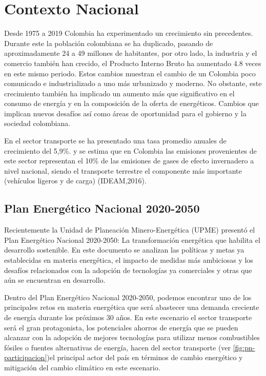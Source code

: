 \chapter{Contexto Nacional}

Desde 1975 a 2019 Colombia ha experimentado un crecimiento sin precedentes. Durante este la población colombiana se ha duplicado, pasando de aproximadamente 24 a 49 millones de habitantes, por otro lado, la industria y el comercio también han crecido, el Producto Interno Bruto ha aumentado 4.8 veces en este mismo periodo. Estos cambios muestran el cambio de un Colombia poco comunicado e industrializado a uno más urbanizado y moderno. \cite{Plan_Energetico-2050} No obstante, este crecimiento también ha implicado un aumento más que significativo en el consumo de energía y en la composición de la oferta de energéticos. Cambios que implican nuevos desafíos así como áreas de oportunidad para el gobierno y la sociedad colombiana. 

En el sector transporte se ha presentado una tasa promedio anuales de crecimiento del  5,9\%. \cite{Plan_Energetico-2050} y se estima que en Colombia las emisiones provenientes de este sector representan el 10\% de las emisiones de gases de efecto invernadero a nivel nacional, siendo el transporte terrestre el componente más importante (vehículos ligeros y de carga) (IDEAM,2016). \cite{InformeFinal_WRI}

\section{Plan Energético Nacional 2020-2050}

Recientemente la Unidad de Planeación Minero-Energética (UPME) presentó el Plan Energético Nacional 2020-2050: La transformación energética que habilita el desarrollo sostenible. En este documento se analizan las políticas y metas ya establecidas en materia energética, el impacto de medidas más ambiciosas y los desafíos relacionados con la adopción de tecnologías ya comerciales y otras que aún se encuentran en desarrollo.

Dentro del Plan Energético Nacional 2020-2050, podemos encontrar uno de los principales retos en materia energética que será abastecer una demanda creciente de energía durante los próximos 30 años. En este escenario el sector transporte será el gran protagonista, los potenciales ahorros de energía que se pueden alcanzar con la adopción de mejores tecnologías para utilizar menos combustibles fósiles o fuentes alternativas de energía, hacen del sector transporte (ver \ref{fig:pn-participacion})el principal actor del país en términos de cambio energético y mitigación del cambio climático en este escenario. \cite{Plan_Energetico-2050}


